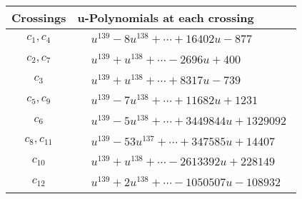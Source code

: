 \documentclass[1p]{elsarticle_modified}
\theoremstyle{definition}
\begin{document}
\begin{tabular}{m{50pt}|m{274pt}}
Crossings & \hspace{64pt}u-Polynomials at each crossing \\
\hline $$\begin{aligned}c_{1},c_{4}\end{aligned}$$&$\begin{aligned}
&u^{139}-8 u^{138}+\cdots+16402 u-877
\end{aligned}$\\
\hline $$\begin{aligned}c_{2},c_{7}\end{aligned}$$&$\begin{aligned}
&u^{139}+u^{138}+\cdots-2696 u+400
\end{aligned}$\\
\hline $$\begin{aligned}c_{3}\end{aligned}$$&$\begin{aligned}
&u^{139}+u^{138}+\cdots+8317 u-739
\end{aligned}$\\
\hline $$\begin{aligned}c_{5},c_{9}\end{aligned}$$&$\begin{aligned}
&u^{139}-7 u^{138}+\cdots+11682 u+1231
\end{aligned}$\\
\hline $$\begin{aligned}c_{6}\end{aligned}$$&$\begin{aligned}
&u^{139}-5 u^{138}+\cdots+3449844 u+1329092
\end{aligned}$\\
\hline $$\begin{aligned}c_{8},c_{11}\end{aligned}$$&$\begin{aligned}
&u^{139}-53 u^{137}+\cdots+347585 u+14407
\end{aligned}$\\
\hline $$\begin{aligned}c_{10}\end{aligned}$$&$\begin{aligned}
&u^{139}+u^{138}+\cdots-2613392 u+228149
\end{aligned}$\\
\hline $$\begin{aligned}c_{12}\end{aligned}$$&$\begin{aligned}
&u^{139}+2 u^{138}+\cdots-1050507 u-108932
\end{aligned}$\\
\hline
\end{tabular}\\~\\
\end{document}
